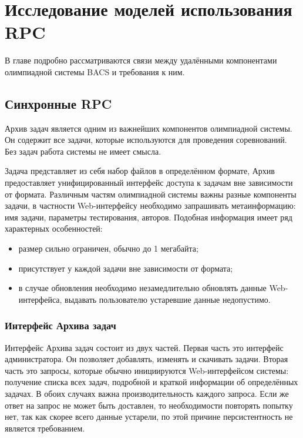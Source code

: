 \chapter{Исследование моделей использования RPC}
В главе подробно рассматриваются связи между удалёнными компонентами
олимпиадной системы BACS и требования к ним.



\section{Синхронные RPC}
Архив задач является одним из важнейших компонентов олимпиадной системы.
Он содержит все задачи, которые используются для проведения соревнований.
Без задач работа системы не имеет смысла.

Задача представляет из себя набор файлов в определённом формате,
Архив предоставляет унифицированный интерфейс доступа к задачам
вне зависимости от формата. Различным частям олимпиадной системы важны
разные компоненты задачи, в частности Web-интерфейсу необходимо запрашивать
метаинформацию: имя задачи, параметры тестирования, авторов. Подобная
информация имеет ряд характерных особенностей:
\begin{itemize}
    \item размер сильно ограничен, обычно до 1 мегабайта;
    \item присутствует у каждой задачи вне зависимости от формата;
    \item в случае обновления необходимо незамедлительно обновлять
        данные Web-интерфейса, выдавать пользователю устаревшие данные
        недопустимо.
\end{itemize}

\subsection{Интерфейс Архива задач}
Интерфейс Архива задач состоит из двух частей. Первая часть это интерфейс
администратора. Он позволяет добавлять, изменять и скачивать задачи.
Вторая часть это запросы, которые обычно инициируются Web-интерфейсом
системы: получение списка всех задач, подробной и краткой информации
об определённых задачах. В обоих случаях важна производительность каждого
запроса. Если же ответ на запрос не может быть доставлен, то необходимости
повторять попытку нет, так как скорее всего данные устарели, по этой причине
персистентность не является требованием.

